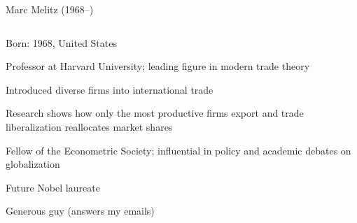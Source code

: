 \documentclass[notes,11pt, aspectratio=169, xcolor=table]{beamer}
\newenvironment{wideitemize}{\itemize\addtolength{\itemsep}{10pt}}{\enditemize}
\begin{document}
\begin{frame}{Marc Melitz (1968–)}
\begin{columns}
    \begin{column}{0.65\textwidth}
        \begin{wideitemize}
            \item Born: 1968, United States
            \item Professor at Harvard University; leading figure in modern trade theory
            \item Introduced diverse firms into international trade
            \item Research shows how only the most productive firms export and trade liberalization reallocates market shares
            \item Fellow of the Econometric Society; influential in policy and academic debates on globalization
            \item Future Nobel laureate
            \item Generous guy (answers my emails)
        \end{wideitemize}
    \end{column}
    

\end{columns}
\end{frame}
\end{document}
